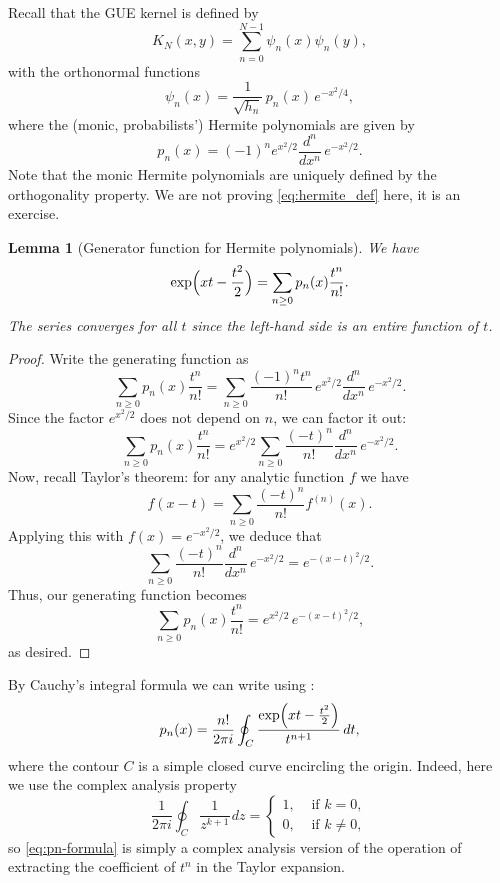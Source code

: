 \documentclass[letterpaper,11pt,oneside,reqno]{article}
\numberwithin{equation}{section}
\newcommand{\ssp}{\hspace{1pt}}
\newtheorem{lemma}[proposition]{Lemma}
\theoremstyle{definition}
\begin{document}
Recall that the GUE kernel is defined by
\[
K_N(x,y)=\sum_{n=0}^{N-1}\psi_n(x)\psi_n(y),
\]
with the orthonormal functions
\[
\psi_n(x)=\frac{1}{\sqrt{h_n}}\,p_n(x)\,e^{-x^2/4},
\]
where the (monic, probabilists') Hermite polynomials are given by
\begin{equation}
\label{eq:hermite_def}
	p_n(x)=(-1)^n e^{x^2/2}\frac{d^n}{dx^n}\,e^{-x^2/2}.
\end{equation}
Note that the monic Hermite polynomials are uniquely defined by the
orthogonality property. We are not proving \eqref{eq:hermite_def} here,
it is an exercise.
\begin{lemma}[Generator function for Hermite polynomials]
	\label{lem:hermite_gen}
	We have
	\[
		\exp\Bigl(xt-\frac{t^2}{2}\Bigr)=\sum_{n\ge0}p_n(x)\frac{t^n}{n!}.
	\]
	The series converges for all \(t\) since the left-hand side is an entire function of \(t\).
\end{lemma}
\begin{proof}
Write the generating function as
\[
	\sum_{n\ge0}p_n(x)\frac{t^n}{n!}
	=\sum_{n\ge0}\frac{(-1)^n t^n}{n!}\,e^{x^2/2}\frac{d^n}{dx^n}\,e^{-x^2/2}.
\]
Since the factor \(e^{x^2/2}\) does not depend on \(n\), we can factor it out:
\[
	\sum_{n\ge0}p_n(x)\frac{t^n}{n!}= e^{x^2/2}\sum_{n\ge0}\frac{(-t)^n}{n!}\frac{d^n}{dx^n}\,e^{-x^2/2}.
\]
Now, recall Taylor's theorem: for any analytic function \(f\) we have
\[
	f(x-t)=\sum_{n\ge0}\frac{(-t)^n}{n!}f^{(n)}(x).
\]
Applying this with \(f(x)=e^{-x^2/2}\), we deduce that
\[
	\sum_{n\ge0}\frac{(-t)^n}{n!}\frac{d^n}{dx^n}\,e^{-x^2/2}= e^{-(x-t)^2/2}.
\]
Thus, our generating function becomes
\[
	\sum_{n\ge0}p_n(x)\frac{t^n}{n!} = e^{x^2/2}\, e^{-(x-t)^2/2},
\]
as desired.
\end{proof}


By Cauchy's integral formula we can write using :
\begin{equation}
\label{eq:pn-formula}
p_n(x)=\frac{n!}{2\pi i}\oint_C\frac{\exp\Bigl(xt-\frac{t^2}{2}\Bigr)}{t^{n+1}}\,dt,
\end{equation}
where the contour \(C\) is a simple closed curve encircling the origin.
Indeed, here we use the complex analysis property
\begin{equation*}
	\frac{1}{2\pi i}\oint_C \frac{1}{z^{k+1}}\ssp dz=\begin{cases}
		1,&\text{ if }k=0,\\
		0,&\text{ if }k\neq0,
	\end{cases}
\end{equation*}
so \eqref{eq:pn-formula} is simply a complex analysis version of the
operation of extracting the coefficient of \(t^n\) in the Taylor expansion.
\end{document}
